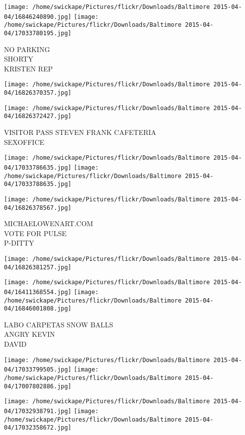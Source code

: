 \documentclass[10pt,letterpaper]{article}
\begin{document}
\vspace{0.25in}
\texttt{[image: /home/swickape/Pictures/flickr/Downloads/Baltimore 2015-04-04/16846240890.jpg]}
\texttt{[image: /home/swickape/Pictures/flickr/Downloads/Baltimore 2015-04-04/17033780195.jpg]}

NO PARKING\\
SHORTY\\
KRISTEN REP
\pagebreak

\texttt{[image: /home/swickape/Pictures/flickr/Downloads/Baltimore 2015-04-04/16826370357.jpg]}

\vspace{0.25in}
\texttt{[image: /home/swickape/Pictures/flickr/Downloads/Baltimore 2015-04-04/16826372427.jpg]}

VISITOR PASS STEVEN FRANK CAFETERIA\\
SEXOFFICE
\pagebreak

\texttt{[image: /home/swickape/Pictures/flickr/Downloads/Baltimore 2015-04-04/17033786635.jpg]}
\texttt{[image: /home/swickape/Pictures/flickr/Downloads/Baltimore 2015-04-04/17033788635.jpg]}

\vspace{0.25in}
\texttt{[image: /home/swickape/Pictures/flickr/Downloads/Baltimore 2015-04-04/16826378567.jpg]}

MICHAELOWENART.COM\\
VOTE FOR PULSE\\
P{-}DITTY
\pagebreak

\texttt{[image: /home/swickape/Pictures/flickr/Downloads/Baltimore 2015-04-04/16826381257.jpg]}

\vspace{0.25in}
\texttt{[image: /home/swickape/Pictures/flickr/Downloads/Baltimore 2015-04-04/16411368554.jpg]}
\texttt{[image: /home/swickape/Pictures/flickr/Downloads/Baltimore 2015-04-04/16846001808.jpg]}

LABO CARPETAS SNOW BALLS\\
ANGRY KEVIN\\
DAVID
\pagebreak

\texttt{[image: /home/swickape/Pictures/flickr/Downloads/Baltimore 2015-04-04/17033799505.jpg]}
\texttt{[image: /home/swickape/Pictures/flickr/Downloads/Baltimore 2015-04-04/17007802886.jpg]}

\texttt{[image: /home/swickape/Pictures/flickr/Downloads/Baltimore 2015-04-04/17032938791.jpg]}
\texttt{[image: /home/swickape/Pictures/flickr/Downloads/Baltimore 2015-04-04/17032358672.jpg]}
\end{document}
